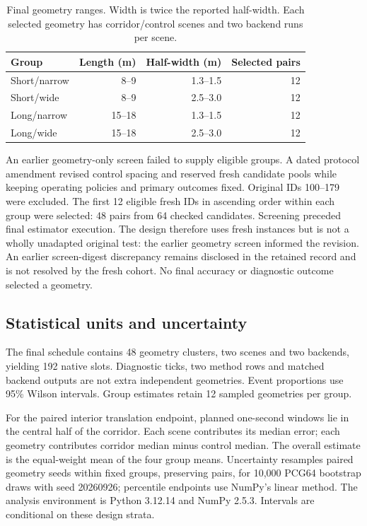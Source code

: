 \documentclass[11pt,a4paper]{article}
\begin{document}
\begin{table}[htbp]
\centering\small
\begin{tabular}{@{}lrrr@{}}
\toprule Group & Length (m) & Half-width (m) & Selected pairs\\\midrule
Short/narrow & 8--9 & 1.3--1.5 & 12\\
Short/wide & 8--9 & 2.5--3.0 & 12\\
Long/narrow & 15--18 & 1.3--1.5 & 12\\
Long/wide & 15--18 & 2.5--3.0 & 12\\\bottomrule
\end{tabular}
\caption{Final geometry ranges. Width is twice the reported half-width.
Each selected geometry has corridor/control scenes and two backend runs per
scene.}\label{tab:design}
\end{table}

An earlier geometry-only screen failed to supply eligible groups. A dated
protocol amendment revised control spacing and reserved fresh candidate
pools while keeping operating policies and primary outcomes fixed.
Original IDs 100--179 were excluded. The first 12 eligible fresh IDs in
ascending order within each group were selected: 48 pairs from 64 checked
candidates. Screening preceded final estimator execution. The design
therefore uses fresh instances but is not a wholly unadapted original test:
the earlier geometry screen informed the revision. An earlier screen-digest
discrepancy remains disclosed in the retained record and is not resolved by
the fresh cohort. No final accuracy or diagnostic outcome selected a geometry.

\subsection{Statistical units and uncertainty}
The final schedule contains 48 geometry clusters, two scenes and two backends,
yielding 192 native slots. Diagnostic ticks, two method rows and matched
backend outputs are not extra independent geometries. Event proportions use
95\% Wilson intervals. Group estimates retain 12 sampled geometries per group.

For the paired interior translation endpoint, planned one-second windows
lie in the central half of the corridor. Each scene contributes its median
error; each geometry contributes corridor median minus control median.
The overall estimate is the equal-weight mean of the four group means.
Uncertainty resamples paired geometry seeds within fixed groups, preserving
pairs, for 10,000 PCG64 bootstrap draws with seed 20260926; percentile
endpoints use NumPy's linear method. The analysis environment is Python
3.12.14 and NumPy 2.5.3. Intervals are conditional on these design strata.
\end{document}
